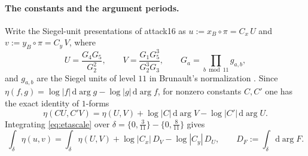 
\paragraph{The constants and the argument periods.}
Write the Siegel-unit presentations of attack16 as
$u := x_B\circ\pi = C_x\,U$ and $v := y_B\circ\pi = C_y\,V$, where
\begin{equation}\label{eq:UVdef}
  U = \frac{G_4 G_5}{G_2^2}, \qquad
  V = \frac{G_1 G_5^3}{G_2^3 G_3}, \qquad
  G_a = \prod_{b \bmod 11} g_{a,b},
\end{equation}
and $g_{a,b}$ are the Siegel units of level $11$ in Brunault's normalization
\cite[§1]{Brunault}. Since
$\eta(f,g) = \log|f|\,\mathrm{d}\!\arg g - \log|g|\,\mathrm{d}\!\arg f$,
for nonzero constants $C, C'$ one has the exact identity of $1$-forms
\begin{equation}\label{eq:etascale}
  \eta(CU, C'V) = \eta(U,V) + \log|C|\,\mathrm{d}\!\arg V
                             - \log|C'|\,\mathrm{d}\!\arg U .
\end{equation}
Integrating \eqref{eq:etascale} over
$\delta = \{0,\tfrac{3}{11}\} - \{0,\tfrac{8}{11}\}$ gives
\begin{equation}\label{eq:correction}
  \int_\delta \eta(u,v) = \int_\delta \eta(U,V)
  + \log|C_x|\, D_V - \log|C_y|\, D_U,
  \qquad D_F := \int_\delta \mathrm{d}\!\arg F .
\end{equation}

